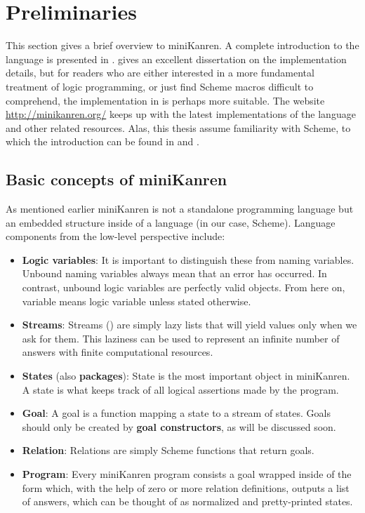 \section{Preliminaries}
\label{prelim}
This section gives a brief overview to miniKanren.
A complete introduction to the language is presented in \textcite{reasoned}.
\textcite{byrdphd} gives an excellent dissertation on the implementation details, but for readers who are either interested in a more fundamental treatment of logic programming, or just find Scheme macros difficult to comprehend, the implementation in \textcite{micro} is perhaps more suitable.
The website \url{http://minikanren.org/} keeps up with the latest implementations of the language and other related resources. Alas, this thesis assume familiarity with Scheme, to which the introduction can be found in \textcite{sicp} and \textcite{tspl4}.

\subsection{Basic concepts of miniKanren}
As mentioned earlier miniKanren is not a standalone programming language but an embedded structure inside of a language (in our case, Scheme). Language components from the low-level perspective include:
\begin{itemize}
\item \textbf{Logic variables}: It is important to distinguish these from naming variables. Unbound naming variables always mean that an error has occurred. In contrast, unbound logic variables are perfectly valid objects. From here on, variable means logic variable unless stated otherwise.
\item \textbf{Streams}: Streams (\cite{sicp}) are simply lazy lists that will yield values only when we ask for them. This laziness can be used to represent an infinite number of answers with finite computational resources.
\item \textbf{States} (also \textbf{packages}): State is the most important object in miniKanren. A state is what keeps track of all logical assertions made by the program.
\item \textbf{Goal}: A goal is a function mapping a state to a stream of states. Goals should only be created by \textbf{goal constructors}, as will be discussed soon.
\item \textbf{Relation}: Relations are simply Scheme functions that return goals.
\item \textbf{Program}: Every miniKanren program consists a goal wrapped inside of the  form which, with the help of zero or more relation definitions, outputs a list of answers, which can be thought of as normalized and pretty-printed states.
\end{itemize}

